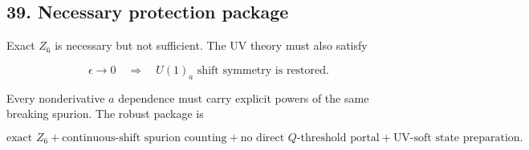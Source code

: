 \documentclass[
]{article}
\begin{document}
\hypertarget{necessary-protection-package}{%
\subsection{39. Necessary protection
package}\label{necessary-protection-package}}

Exact \(Z_6\) is necessary but not sufficient. The UV theory must also
satisfy

\[
\epsilon\rightarrow0
\quad\Longrightarrow\quad
U(1)_a\text{ shift symmetry is restored}.
\]

Every nonderivative \(a\) dependence must carry explicit powers of the
same breaking spurion. The robust package is

\[
\boxed{
\text{exact }Z_6
+\text{continuous-shift spurion counting}
+\text{no direct }Q\text{-threshold portal}
+\text{UV-soft state preparation}.
}
\]
\end{document}
